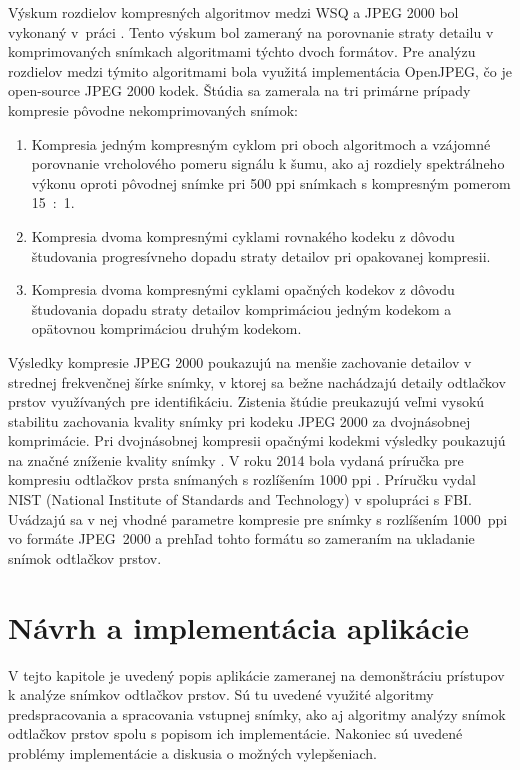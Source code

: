   Výskum rozdielov kompresných algoritmov medzi WSQ a JPEG 2000 bol vykonaný v~práci \cite{Libert}. Tento výskum bol zameraný na porovnanie straty detailu
  v komprimovaných snímkach algoritmami týchto dvoch formátov. Pre analýzu rozdielov medzi týmito algoritmami bola využitá implementácia OpenJPEG,
  čo je open-source JPEG 2000 kodek. Štúdia sa zamerala na tri primárne prípady kompresie pôvodne nekomprimovaných snímok:
  \begin{enumerate}
    \item Kompresia jedným kompresným cyklom pri oboch algoritmoch a vzájomné porovnanie vrcholového pomeru signálu k šumu, ako aj rozdiely spektrálneho
          výkonu oproti pôvodnej snímke pri 500 ppi snímkach s kompresným pomerom 15~:~1.
    \item Kompresia dvoma kompresnými cyklami rovnakého kodeku z dôvodu študovania progresívneho dopadu straty detailov pri opakovanej kompresii.
    \item Kompresia dvoma kompresnými cyklami opačných kodekov z dôvodu študovania dopadu straty detailov komprimáciou jedným kodekom a opätovnou komprimáciou
          druhým kodekom.
  \end{enumerate}
  Výsledky kompresie JPEG 2000 poukazujú na menšie zachovanie detailov v strednej frekvenčnej šírke snímky, v ktorej sa bežne nachádzajú detaily odtlačkov
  prstov využívaných pre identifikáciu. Zistenia štúdie preukazujú veľmi vysokú stabilitu zachovania kvality snímky pri kodeku JPEG 2000 za dvojnásobnej
  komprimácie. Pri dvojnásobnej kompresii opačnými kodekmi výsledky poukazujú na značné zníženie kvality snímky \cite{Libert}. V roku 2014 bola vydaná
  príručka pre kompresiu odtlačkov prsta snímaných s rozlíšením 1000 ppi \cite{orandi2014guidance}. Príručku vydal NIST (National Institute of Standards
  and Technology) v spolupráci s FBI. Uvádzajú sa v nej vhodné parametre kompresie pre snímky s rozlíšením 1000~ppi vo formáte JPEG~2000 a prehľad
  tohto formátu so zameraním na ukladanie snímok odtlačkov prstov.

\chapter{Návrh a implementácia aplikácie} \label{kap:navrh_appky}
  V tejto kapitole je uvedený popis aplikácie zameranej na demonštráciu prístupov k analýze snímkov odtlačkov prstov. Sú tu uvedené využité algoritmy
  predspracovania a spracovania vstupnej snímky, ako aj algoritmy analýzy snímok odtlačkov prstov spolu s popisom ich implementácie. Nakoniec sú uvedené
  problémy implementácie a diskusia o možných vylepšeniach.

